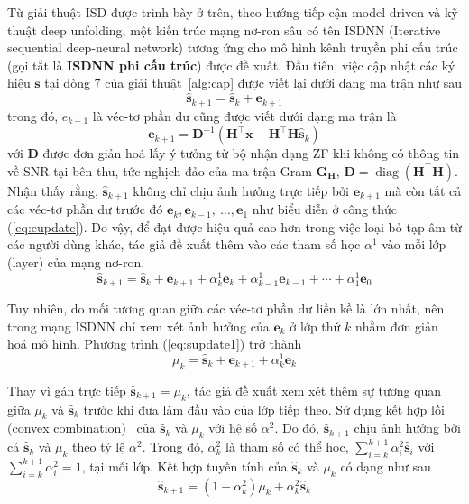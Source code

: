 Từ giải thuật ISD được trình bày ở trên, theo hướng tiếp cận model-driven và kỹ thuật deep unfolding, một kiến trúc mạng nơ-ron sâu có tên ISDNN (Iterative sequential deep-neural network) tương ứng cho mô hình kênh truyền phi cấu trúc (gọi tắt là \textbf{ISDNN phi cấu trúc}) được đề xuất. Đầu tiên, việc cập nhật các ký hiệu $\mathbf{s}$ tại dòng $7$ của giải thuật~\ref{alg:cap} được viết lại dưới dạng ma trận như sau
\begin{equation}
\hat{\mathbf{s}}_{k+1}=\hat{\mathbf{s}}_k+\mathbf{e}_{k+1}
\end{equation}
trong đó, $e_{k+1}$ là véc-tơ phần dư cũng được viết dưới dạng ma trận là
\begin{equation}
    \mathbf{e}_{k+1}=\mathbf{D}^{-1}\left(\mathbf{H}^\top \mathbf{x}-\mathbf{H}^\top \mathbf{H} \hat{\mathbf{s}}_k\right)
\end{equation}
với $\mathbf{D}$ được đơn giản hoá lấy ý tưởng từ bộ nhận dạng ZF khi không có thông tin về SNR tại bên thu, tức nghịch đảo của ma trận Gram $\mathbf{G}_\mathbf{H}$, $\mathbf{D} = \operatorname{diag}(\mathbf{H}^\top \mathbf{H})$. 
Nhận thấy rằng, $\hat{\mathbf{s}}_{k+1}$ không chỉ chịu ảnh hưởng trực tiếp bởi $\mathbf{e}_{k+1}$ mà còn tất cả các véc-tơ phần dư trước đó $\mathbf{e}_{k}, \mathbf{e}_{k-1},~\ldots, \mathbf{e}_{1}$ như biểu diễn ở công thức (\ref{eq:eupdate}). Do vậy, để đạt được hiệu quả cao hơn trong việc loại bỏ tạp âm từ các người dùng khác, tác giả đề xuất thêm vào các tham số học $\alpha^1$ vào mỗi lớp (layer) của mạng nơ-ron.
\begin{equation}
\label{eq:supdate1}
\hat{\mathbf{s}}_{k+1}=\hat{\mathbf{s}}_k+\mathbf{e}_{k+1}+\alpha_k^{1} \mathbf{e}_k+\alpha_{k-1}^{1} \mathbf{e}_{k-1}+\cdots+\alpha_1^{1} \mathbf{e}_0
\end{equation}

Tuy nhiên, do mối tương quan giữa các véc-tơ phần dư liền kề là lớn nhất, nên trong mạng ISDNN chỉ xem xét ảnh hưởng của $\mathbf{e}_k$ ở lớp thứ $k$ nhằm đơn giản hoá mô hình. Phương trình (\ref{eq:supdate1}) trở thành 
\begin{equation}
\mu_{k}=\hat{\mathbf{s}}_k+\mathbf{e}_{k+1}+\alpha_k^1 \mathbf{e}_k
\end{equation}

Thay vì gán trực tiếp $\hat{\mathbf{s}}_{k+1} = \mu_k$, tác giả đề xuất xem xét thêm sự tương quan giữa $\mu_k$ và $\hat{\mathbf{s}}_k$ trước khi đưa làm đầu vào của lớp tiếp theo. Sử dụng kết hợp lồi (convex combination)~\cite{hammad2023} của $\hat{\mathbf{s}}_k$ và $\mu_k$ với hệ số $\alpha^2$. Do đó, $\hat{\mathbf{s}}_{k+1}$ chịu ảnh hưởng bởi cả $\hat{\mathbf{s}}_k$ và $\mu_k$ theo tỷ lệ $\alpha^2$. 
Trong đó, $\alpha^2_k$ là tham số có thể học, $\sum_{i=k}^{k+1} \alpha_i^{2} \hat{\mathbf{s}}_i$ với $\sum_{i=k}^{k+1} \alpha_i^{2}=1$, tại mỗi lớp. Kết hợp tuyến tính của $\hat{\mathbf{s}}_k$ và $\mu_k$ có dạng như sau
\begin{equation}
\hat{\mathbf{s}}_{k+1}=\left(1-\alpha_k^2\right) \mu_k + \alpha_k^2 \hat{\mathbf{s}}_k
\end{equation}

